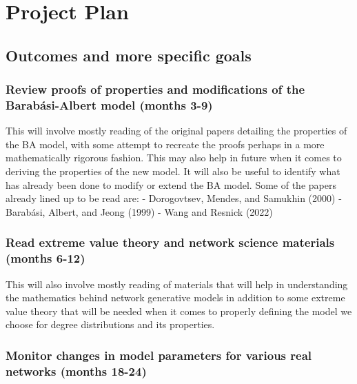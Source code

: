 \documentclass[
]{article}
\begin{document}
\newpage{}

\section{Project Plan}\label{project-plan}

\subsection{Outcomes and more specific
goals}\label{outcomes-and-more-specific-goals}

\subsubsection*{Review proofs of properties and modifications of the
Barabási-Albert model (months
3-9)}\label{review-proofs-of-properties-and-modifications-of-the-barabuxe1si-albert-model-months-3-9}

This will involve mostly reading of the original papers detailing the
properties of the BA model, with some attempt to recreate the proofs
perhaps in a more mathematically rigorous fashion. This may also help in
future when it comes to deriving the properties of the new model. It
will also be useful to identify what has already been done to modify or
extend the BA model. Some of the papers already lined up to be read are:
- Dorogovtsev, Mendes, and Samukhin (2000) - Barabási, Albert, and Jeong
(1999) - Wang and Resnick (2022)

\subsubsection*{Read extreme value theory and network science materials
(months
6-12)}\label{read-extreme-value-theory-and-network-science-materials-months-6-12}

This will also involve mostly reading of materials that will help in
understanding the mathematics behind network generative models in
addition to some extreme value theory that will be needed when it comes
to properly defining the model we choose for degree distributions and
its properties.

\subsubsection*{Monitor changes in model parameters for various real
networks (months
18-24)}\label{monitor-changes-in-model-parameters-for-various-real-networks-months-18-24}
\end{document}
